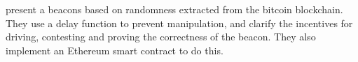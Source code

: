 \item[Proofs-of-Delay and Randomness Beacons in Ethereum]
\citet{bunz2017proofsof} present a beacons based on randomness extracted from the bitcoin blockchain. They use a delay function to prevent manipulation, and clarify the incentives for driving, contesting and proving the correctness of the beacon. They also implement an Ethereum smart contract to do this.